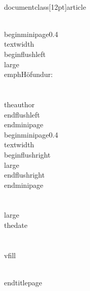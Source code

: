 \\documentclass[12pt]{article}
\begin{document}
    \\begin{minipage}{0.4\\textwidth}
        \\begin{flushleft} \\large
            \\emph{Höfundur:}\\\\
            \\theauthor
            \\end{flushleft}
            \\end{minipage}~
            \\begin{minipage}{0.4\\textwidth}
            \\begin{flushright} \\large
        \\end{flushright}
    \\end{minipage}\\\\[2 cm]
    
    {\\large \\thedate}\\\\[2 cm]

    \\vfill
    
\\end{titlepage}


\
\end{document}
